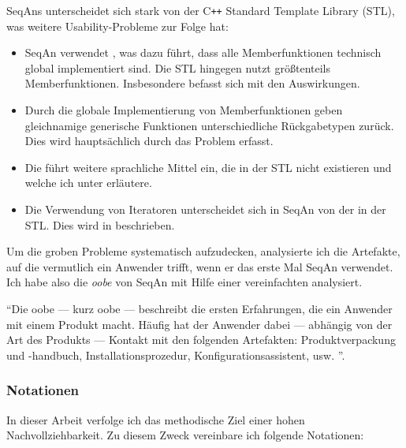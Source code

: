 \documentclass[11pt,a4paper]{book}
\begin{document}
     SeqAns unterscheidet sich stark von der C\texttt{++} Standard Template Library (STL), was weitere Usability-Probleme zur Folge hat:
     \begin{itemize}
       \item SeqAn verwendet , was dazu führt, dass alle Memberfunktionen technisch global implementiert sind. Die STL hingegen nutzt größtenteils Memberfunktionen. Insbesondere  befasst sich mit den Auswirkungen.
       \item Durch die globale Implementierung von Memberfunktionen geben gleichnamige generische Funktionen unterschiedliche Rückgabetypen zurück. Dies wird hauptsächlich durch das Problem  erfasst.
       \item Die  führt weitere sprachliche Mittel ein, die in der STL nicht existieren und welche ich unter  erläutere.
       \item Die Verwendung von Iteratoren unterscheidet sich in SeqAn von der in der STL. Dies wird in  beschrieben.
     \end{itemize}
     
Um die groben Probleme systematisch aufzudecken, analysierte ich die Artefakte, auf die vermutlich ein Anwender trifft, wenn er das erste Mal SeqAn verwendet. Ich habe also die \textit{\gls{oobe}} \citep{Fouts:2000:SLE:353360.353375} von SeqAn mit Hilfe einer vereinfachten \textit{} analysiert.
     
``Die \acrlong{oobe} --- kurz \acrshort{oobe} --- beschreibt die ersten Erfahrungen, die ein Anwender mit einem Produkt macht. Häufig hat der Anwender dabei --- abhängig von der Art des Produkts --- Kontakt mit den folgenden Artefakten: Produktverpackung und -handbuch, Installationsprozedur, Konfigurationsassistent, usw. \citep{Fouts:2000:SLE:353360.353375}''. \citep{Kahlert:2011wr}

\subsubsection{Notationen}
\label{sec:notationen}

In dieser Arbeit verfolge ich das methodische Ziel einer hohen Nachvollziehbarkeit. Zu diesem Zweck vereinbare ich folgende Notationen:
\end{document}
